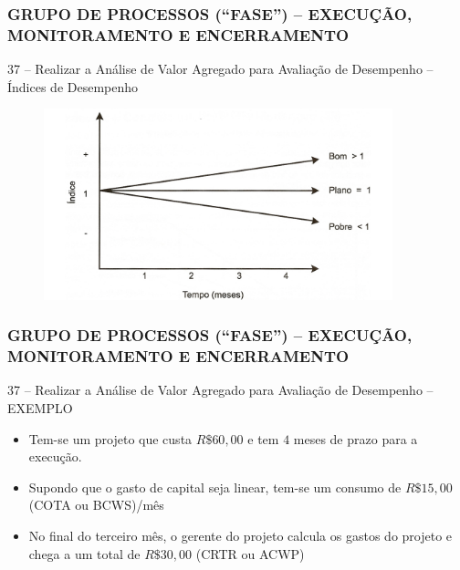 \begin{frame}
 \frametitle{GRUPO DE PROCESSOS (“FASE”) – \small{EXECUÇÃO, MONITORAMENTO E ENCERRAMENTO}}
 37 – Realizar a Análise de Valor Agregado para Avaliação de Desempenho –  Índices de Desempenho
   \begin{figure}
   \centering
   \includegraphics[width = 0.9\textwidth]{figs/fig8.png}
  \end{figure}
\end{frame}


\begin{frame}
 \frametitle{GRUPO DE PROCESSOS (“FASE”) – \small{EXECUÇÃO, MONITORAMENTO E ENCERRAMENTO}}
 37 – Realizar a Análise de Valor Agregado para Avaliação de Desempenho – EXEMPLO
  \begin{itemize}
   \item Tem-se um projeto que custa $R\$60,00$ e tem $4$ meses de prazo para a execução.
   \item Supondo que o gasto de capital seja linear, tem-se um consumo de $R\$15,00$ (COTA ou BCWS)/mês
    \item No final do terceiro mês, o gerente do projeto calcula os gastos do projeto e chega a um total de $R\$30,00$ (CRTR ou ACWP)
  \end{itemize}
\end{frame}

